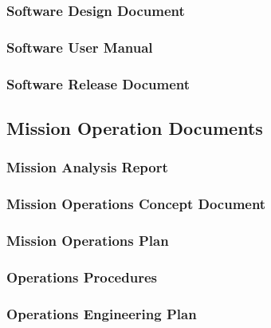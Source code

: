 \subsubsection{Software Design Document}
\label{app:Software Design Document}

\subsubsection{Software User Manual}
\label{app:Software User Manual}

\subsubsection{Software Release Document}
\label{app:Software Release Document}

\clearpage
\subsection{Mission Operation Documents}

\subsubsection{Mission Analysis Report}
\label{app:Mission Analysis Report}

\subsubsection{Mission Operations Concept Document}
\label{app:Mission Operations Concept Document}

\subsubsection{Mission Operations Plan}
\label{app:Mission Operations Plan}

\subsubsection{Operations Procedures}
\label{app:Operations Procedures}

\subsubsection{Operations Engineering Plan}
\label{app:Operations Engineering Plan}

